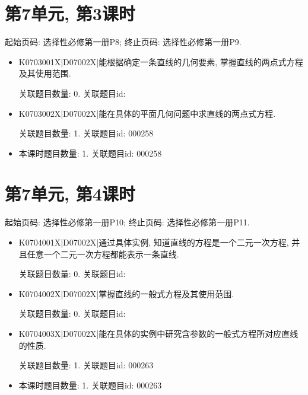 \section*{第7单元, 第3课时}
起始页码: 选择性必修第一册P8; 终止页码: 选择性必修第一册P9.
\begin{itemize}
\item K0703001X|D07002X|能根据确定一条直线的几何要素, 掌握直线的两点式方程及其使用范围.

关联题目数量: 0. 关联题目id: 

\item K0703002X|D07002X|能在具体的平面几何问题中求直线的两点式方程.

关联题目数量: 1. 关联题目id: 000258

\item 本课时题目数量: 1. 关联题目id: 000258

\end{itemize}

\section*{第7单元, 第4课时}
起始页码: 选择性必修第一册P10; 终止页码: 选择性必修第一册P11.
\begin{itemize}
\item K0704001X|D07002X|通过具体实例, 知道直线的方程是一个二元一次方程, 并且任意一个二元一次方程都能表示一条直线.

关联题目数量: 0. 关联题目id: 

\item K0704002X|D07002X|掌握直线的一般式方程及其使用范围.

关联题目数量: 0. 关联题目id: 

\item K0704003X|D07002X|能在具体的实例中研究含参数的一般式方程所对应直线的性质.

关联题目数量: 1. 关联题目id: 000263

\item 本课时题目数量: 1. 关联题目id: 000263

\end{itemize}

